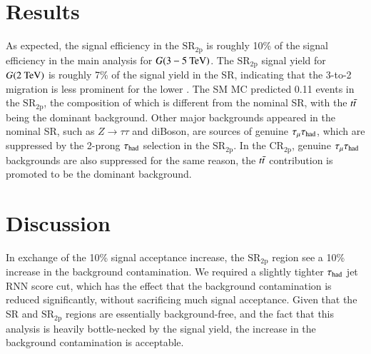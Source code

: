 \section*{Results}
    As expected, the signal efficiency in the $\mathrm{SR}_\mathrm{2p}$ is roughly 10\% of the signal efficiency in the main analysis for $G(3-5~\text{TeV})$. 
    The $\mathrm{SR}_\mathrm{2p}$ signal yield for $G(2~\text{TeV})$ is roughly 7\% of the signal yield in the SR, indicating 
    that the 3-to-2 migration is less prominent for the lower \pt \tauhad.
    The SM MC predicted 0.11 events in the $\mathrm{SR}_\mathrm{2p}$, the composition of which is different from the nominal SR, 
    with the $t\bar{t}$ being the dominant background. 
    Other major backgrounds appeared in the nominal SR, such as $Z\rightarrow\tau\tau$ and diBoson,
    are sources of genuine $\tau_\mathrm{\mu}\tau_\mathrm{had}$, which are suppressed by the 2-prong $\tau_{\text{had}}$ selection in the $\mathrm{SR}_\mathrm{2p}$. 
    In the $\mathrm{CR}_\mathrm{2p}$, genuine $\tau_\mathrm{\mu}\tau_\mathrm{had}$ backgrounds are also suppressed for the same reason, the $t\bar{t}$ contribution is promoted 
    to be the dominant background. 
\section*{Discussion}
    In exchange of the 10\% signal acceptance increase, 
    the $\mathrm{SR}_\mathrm{2p}$ region see a 10\% increase in the background contamination.
    We required a slightly tighter $\tau_{\text{had}}$ jet RNN score cut, which has the effect that 
    the background contamination is reduced
    significantly, without sacrificing much signal acceptance.
    Given that the SR and $\mathrm{SR}_\mathrm{2p}$ regions are essentially background-free, 
    and the fact that this analysis is heavily bottle-necked by the signal yield,
    the increase in the background contamination is acceptable.


